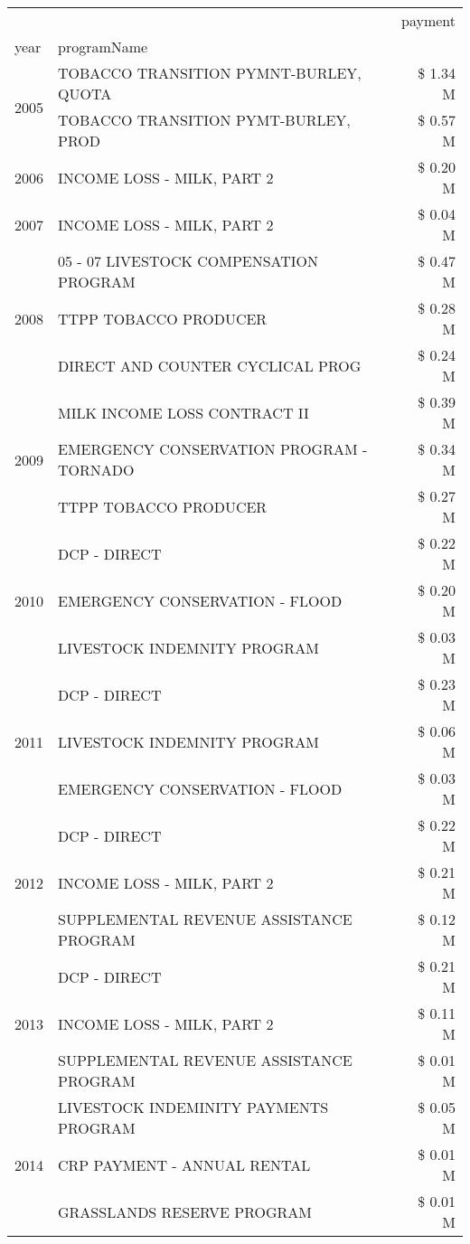 \begin{tabular}{llr}
\toprule
 &  & payment \\
year & programName &  \\
\midrule
\multirow[t]{2}{*}{2005} & TOBACCO TRANSITION PYMNT-BURLEY, QUOTA & \$ 1.34 M \\
 & TOBACCO TRANSITION PYMT-BURLEY, PROD & \$ 0.57 M \\
\cline{1-3}
2006 & INCOME LOSS - MILK, PART 2 & \$ 0.20 M \\
\cline{1-3}
2007 & INCOME LOSS - MILK, PART 2 & \$ 0.04 M \\
\cline{1-3}
\multirow[t]{3}{*}{2008} & 05 - 07 LIVESTOCK COMPENSATION PROGRAM & \$ 0.47 M \\
 & TTPP TOBACCO PRODUCER & \$ 0.28 M \\
 & DIRECT AND COUNTER CYCLICAL PROG & \$ 0.24 M \\
\cline{1-3}
\multirow[t]{3}{*}{2009} & MILK INCOME LOSS CONTRACT II & \$ 0.39 M \\
 & EMERGENCY CONSERVATION PROGRAM - TORNADO & \$ 0.34 M \\
 & TTPP TOBACCO PRODUCER & \$ 0.27 M \\
\cline{1-3}
\multirow[t]{3}{*}{2010} & DCP - DIRECT & \$ 0.22 M \\
 & EMERGENCY CONSERVATION - FLOOD & \$ 0.20 M \\
 & LIVESTOCK INDEMNITY PROGRAM & \$ 0.03 M \\
\cline{1-3}
\multirow[t]{3}{*}{2011} & DCP - DIRECT & \$ 0.23 M \\
 & LIVESTOCK INDEMNITY PROGRAM & \$ 0.06 M \\
 & EMERGENCY CONSERVATION - FLOOD & \$ 0.03 M \\
\cline{1-3}
\multirow[t]{3}{*}{2012} & DCP - DIRECT & \$ 0.22 M \\
 & INCOME LOSS - MILK, PART 2 & \$ 0.21 M \\
 & SUPPLEMENTAL REVENUE ASSISTANCE PROGRAM & \$ 0.12 M \\
\cline{1-3}
\multirow[t]{3}{*}{2013} & DCP - DIRECT & \$ 0.21 M \\
 & INCOME LOSS - MILK, PART 2 & \$ 0.11 M \\
 & SUPPLEMENTAL REVENUE ASSISTANCE PROGRAM & \$ 0.01 M \\
\cline{1-3}
\multirow[t]{3}{*}{2014} & LIVESTOCK INDEMINITY PAYMENTS PROGRAM & \$ 0.05 M \\
 & CRP PAYMENT - ANNUAL RENTAL & \$ 0.01 M \\
 & GRASSLANDS RESERVE PROGRAM & \$ 0.01 M \\

\end{tabular}
